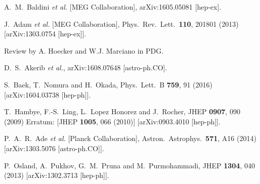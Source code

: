 \documentclass[%
showkeys,12pt,
preprint,preprintnumbers,nofootinbib,
groupedaddress,superscriptaddress,amsmath,amssymb]{revtex4}
\numberwithin{equation}{section}
\begin{document}
\begin{thebibliography}{99}
  A.~M.~Baldini {\it et al.} [MEG Collaboration],
  arXiv:1605.05081 [hep-ex].
  
  
  J.~Adam {\it et al.} [MEG Collaboration],
  Phys.\ Rev.\ Lett.\  {\bf 110}, 201801 (2013)
  [arXiv:1303.0754 [hep-ex]].


Review by A. Hoecker and W.J. Marciano in PDG.

  D.~S.~Akerib {\it et al.},
  arXiv:1608.07648 [astro-ph.CO].
  
  S.~Baek, T.~Nomura and H.~Okada,
  Phys.\ Lett.\ B {\bf 759}, 91 (2016)
  [arXiv:1604.03738 [hep-ph]].

  T.~Hambye, F.-S.~Ling, L.~Lopez Honorez and J.~Rocher,
  JHEP {\bf 0907}, 090 (2009)
  Erratum: [JHEP {\bf 1005}, 066 (2010)]
  [arXiv:0903.4010 [hep-ph]].
  
  
  P.~A.~R.~Ade {\it et al.} [Planck Collaboration],
  Astron.\ Astrophys.\  {\bf 571}, A16 (2014)
  [arXiv:1303.5076 [astro-ph.CO]].

  P.~Osland, A.~Pukhov, G.~M.~Pruna and M.~Purmohammadi,
  JHEP {\bf 1304}, 040 (2013)
  [arXiv:1302.3713 [hep-ph]].


\end{thebibliography}
\end{document}
